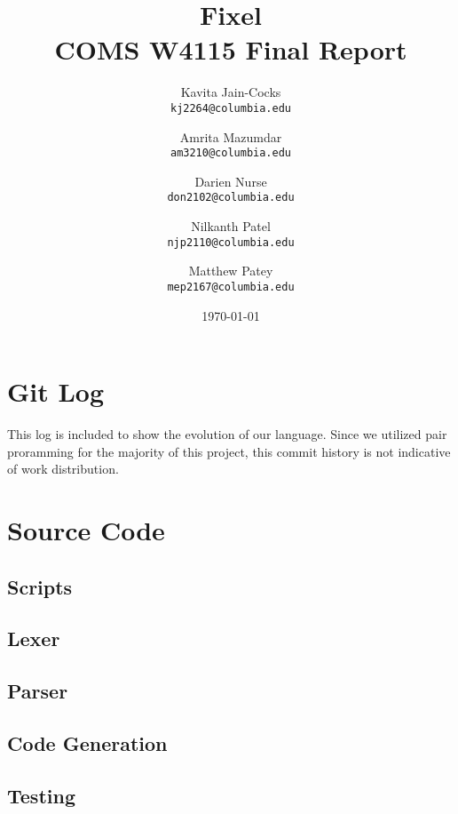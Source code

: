 \documentclass{article}
\title{Fixel \\
COMS W4115 Final Report}
\author{
  Kavita Jain-Cocks\\
  \texttt{kj2264@columbia.edu}
  \and
  Amrita Mazumdar\\
  \texttt{am3210@columbia.edu}
  \and
  Darien Nurse\\
  \texttt{don2102@columbia.edu}
  \and
  Nilkanth Patel\\
  \texttt{njp2110@columbia.edu}
  \and
  Matthew Patey\\
  \texttt{mep2167@columbia.edu}
   \\}
\date{\today}
\begin{document}
\maketitle
\newpage
\tableofcontents
\newpage











\newpage
\appendix
\section{Git Log}
This log is included to show the evolution of our language.  Since we utilized pair proramming for the majority of this project, this commit history is not indicative of work distribution.


\section{Source Code}
	\subsection{Scripts}
		
		
		
		
    \subsection{Lexer}
         
    \subsection{Parser}
        
    \subsection{Code Generation}
        
        
        
    \subsection{Testing}
        
        
        
        
        
        
\end{document}
